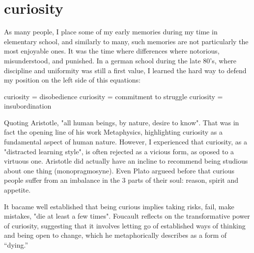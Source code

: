 \chapter*{curiosity}

As many people, I place some of my early memories during my time in elementary school, and similarly to many, such memories are not particularly the most enjoyable ones. It was the time where differences where notorious, misunderstood, and punished. In a german school during the late 80's, where discipline and uniformity was still a first value, I learned the hard way to defend my position on the left side of this equations: 

curiosity = disobedience
curiosity = commitment to struggle %
curiosity = insubordination

Quoting Aristotle, "all human beings, by nature, desire to know". That was in fact the opening line of his work Metaphysics, highlighting curiosity as a fundamental aspect of human nature.  However, I experienced that curiosity, as a "distracted learning style", is often rejected as a vicious form, as oposed to a virtuous one. Aristotle did actually have an incline to recommend being studious about one thing (monopragmosyne). Even Plato argueed before that curious people suffer from an imbalance in the 3 parts of their soul: reason, spirit and appetite. \citep{perry}

It bacame well established that being curious implies taking risks, fail, make mistakes, "die at least a few times". \citep{foucault1980masked} Foucault reflects on the transformative power of curiosity, suggesting that it involves letting go of established ways of thinking and being open to change, which he metaphorically describes as a form of “dying.”




